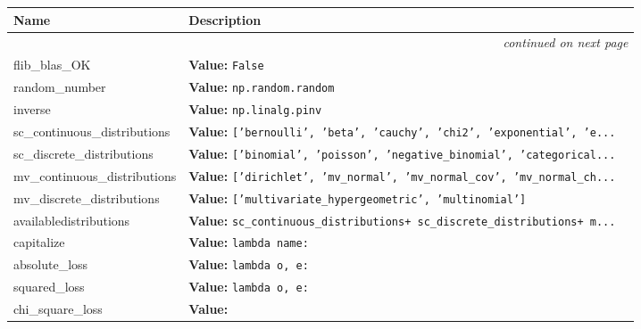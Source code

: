 \begin{longtable}{|p{}|p{}|l}
\cline{1-2}
\cline{1-2} \centering \textbf{Name} & \centering \textbf{Description}& \\
\cline{1-2}
\endhead\cline{1-2}\multicolumn{3}{r}{\small\textit{continued on next page}}\\\endfoot\cline{1-2}
\endlastfoot\raggedright f\-l\-i\-b\-\_\-b\-l\-a\-s\-\_\-O\-K\- & \raggedright \textbf{Value:} 
{\tt False}&\\
\cline{1-2}
\raggedright r\-a\-n\-d\-o\-m\-\_\-n\-u\-m\-b\-e\-r\- & \raggedright \textbf{Value:} 
{\tt np.random.random}&\\
\cline{1-2}
\raggedright i\-n\-v\-e\-r\-s\-e\- & \raggedright \textbf{Value:} 
{\tt np.linalg.pinv}&\\
\cline{1-2}
\raggedright s\-c\-\_\-c\-o\-n\-t\-i\-n\-u\-o\-u\-s\-\_\-d\-i\-s\-t\-r\-i\-b\-u\-t\-i\-o\-n\-s\- & \raggedright \textbf{Value:} 
{\tt ['bernoulli', 'beta', 'cauchy', 'chi2', 'exponential', 'e\texttt{...}}&\\
\cline{1-2}
\raggedright s\-c\-\_\-d\-i\-s\-c\-r\-e\-t\-e\-\_\-d\-i\-s\-t\-r\-i\-b\-u\-t\-i\-o\-n\-s\- & \raggedright \textbf{Value:} 
{\tt ['binomial', 'poisson', 'negative\_binomial', 'categorical\texttt{...}}&\\
\cline{1-2}
\raggedright m\-v\-\_\-c\-o\-n\-t\-i\-n\-u\-o\-u\-s\-\_\-d\-i\-s\-t\-r\-i\-b\-u\-t\-i\-o\-n\-s\- & \raggedright \textbf{Value:} 
{\tt ['dirichlet', 'mv\_normal', 'mv\_normal\_cov', 'mv\_normal\_ch\texttt{...}}&\\
\cline{1-2}
\raggedright m\-v\-\_\-d\-i\-s\-c\-r\-e\-t\-e\-\_\-d\-i\-s\-t\-r\-i\-b\-u\-t\-i\-o\-n\-s\- & \raggedright \textbf{Value:} 
{\tt ['multivariate\_hypergeometric', 'multinomial']}&\\
\cline{1-2}
\raggedright a\-v\-a\-i\-l\-a\-b\-l\-e\-d\-i\-s\-t\-r\-i\-b\-u\-t\-i\-o\-n\-s\- & \raggedright \textbf{Value:} 
{\tt sc\_continuous\_distributions+ sc\_discrete\_distributions+ m\texttt{...}}&\\
\cline{1-2}
\raggedright c\-a\-p\-i\-t\-a\-l\-i\-z\-e\- & \raggedright \textbf{Value:} 
{\tt lambda name:}&\\
\cline{1-2}
\raggedright a\-b\-s\-o\-l\-u\-t\-e\-\_\-l\-o\-s\-s\- & \raggedright \textbf{Value:} 
{\tt lambda o, e:}&\\
\cline{1-2}
\raggedright s\-q\-u\-a\-r\-e\-d\-\_\-l\-o\-s\-s\- & \raggedright \textbf{Value:} 
{\tt lambda o, e:}&\\
\cline{1-2}
\raggedright c\-h\-i\-\_\-s\-q\-u\-a\-r\-e\-\_\-l\-o\-s\-s\- & \raggedright \textbf{Value:} 

\end{longtable}
